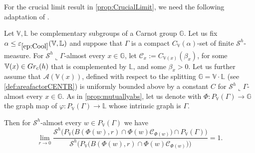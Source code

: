 \documentclass[10pt, a4paper,
oneside, headinclude,footinclude]{scrartcl}
\begin{document}
For the crucial limit result in \cref{prop:CrucialLimit}, we need the following adaptation of \cite[Proposition 4.10]{antonelli2020rectifiable}.
\begin{proposizione}
\label{prop:vitali2PDAdapted}
Let $\mathbb V,\mathbb L$ be complementary subgroups of a Carnot group $\mathbb G$. Let us fix $\alpha\leq\oldep{ep:Cool}(\mathbb V,\mathbb L)$ and suppose that $\Gamma$ is a compact $C_\mathbb{V}(\alpha)$-set of finite $\mathcal{S}^h$-measure. For $\mathcal{S}^h\llcorner\Gamma$-almost every $x\in\mathbb G$, let $\mathcal{C}_x:=C_{\mathbb V(x)}(\beta_x)$, for some $\mathbb V(x)\in Gr_c(h)$ that is complemented by $\mathbb L$, and some $\beta_x>0$. Let us further assume that $\mathcal{A}(\mathbb V(x))$, defined with respect to the splitting $\mathbb G=\mathbb V\cdot\mathbb L$ (see \cref{def:areafactorCENTR}) is uniformly bounded above by a constant $C$ for $\mathcal{S}^h\llcorner\Gamma$-almost every $x\in\mathbb G$. As in \cref{prop:mutuallyabs}, let us denote with $\Phi:P_{\mathbb V}(\Gamma)\to\mathbb G$ the graph map of $\varphi:P_{\mathbb V}(\Gamma)\to \mathbb L$ whose intrinsic graph is $\Gamma$.

Then for $\mathcal{S}^h$-almost every $w\in P_\mathbb{V}(\Gamma)$ we have
\begin{equation}
    \lim_{r\to 0}\frac{\mathcal{S}^h\big(P_\mathbb{V}\big(B(\Phi(w),r)\cap \Phi(w)\mathcal{C}_{\Phi(w)}\big)\cap P_\mathbb{V}(\Gamma)\big)}{\mathcal{S}^h\big(P_\mathbb{V}\big(B(\Phi(w),r)\cap \Phi(w)\mathcal{C}_{\Phi(w)}\big)\big)}=1.
    \label{eq:limiAdapted}
\end{equation}
\end{proposizione}
\end{document}
